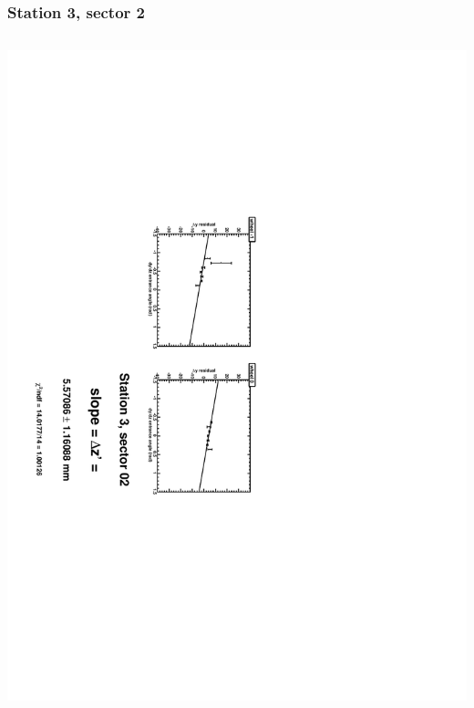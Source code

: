 \documentclass[compress]{beamer}
\begin{document}
\begin{frame}
\frametitle{Station 3, sector 2}
\begin{columns}
\includegraphics[height=\linewidth, angle=90]{zfits/zfit_3_02.pdf}


\end{columns}
\end{frame}
\end{document}
